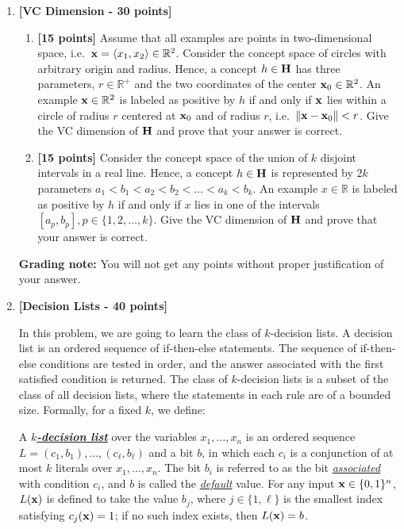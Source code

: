 \begin{enumerate}
\item \textbf{[VC Dimension - 30 points]}
\begin{enumerate}
  \item \textbf{[15 points]}  Assume that all examples are points in two-dimensional space,
  i.e.~${\bf x} = \langle x_1, x_2\rangle \in \mathbb{R}^2$.
Consider the concept space of circles with
  arbitrary origin and radius. Hence, a concept $h \in {\bf H}$ has three
  parameters, $r \in \mathbb{R}^+$ and the two coordinates of the center ${\bf x}_0 \in \mathbb{R}^2$.
  An example ${\bf x} \in \mathbb{R}^2$ is labeled as positive by $h$
  if and only if ${\bf x}$ lies within a circle of radius $r$ centered at ${\bf x}_0$ and of
  radius $r$, i.e.~$\|{\bf x} - {\bf x}_0\| < r$. Give the VC dimension of ${\bf H}$ and prove that your answer is correct.

  \item \textbf{[15 points]} Consider the concept space of the union of $k$ disjoint intervals in a real line.
  Hence, a concept $h \in {\bf H}$ is represented by $2k$ parameters $a_1 < b_1 < a_2 < b_2 < \ldots < a_k < b_k$.
  An example $x \in \mathbb{R}$ is labeled as positive by $h$
  if and only if $x$ lies in one of the intervals $[a_p,b_p], p\in \{1,2,\ldots,k\}$. Give the VC dimension of ${\bf H}$ and  prove that your answer is correct.

  \end{enumerate}

{\bf Grading note:} You will not get any points without proper justification of your answer.

\item \textbf{[Decision Lists - 40 points]}

  In this problem, we are going to learn the class of $k$-decision
  lists.  A decision list is an ordered sequence of if-then-else
  statements. The sequence of if-then-else conditions are tested in
  order, and the answer associated with the first satisfied condition is
  returned. The class of $k$-decision lists is a subset of the class of all 
  decision lists, where the statements in each rule are of a bounded size.
  Formally, for a fixed $k$, we define:

\begin{definition}
  A \textbf{\underline{\em $k$-decision list}} over the variables $x_1, \ldots, x_n$
  is an ordered sequence $L=(c_1, b_1), \ldots, (c_\ell, b_\ell)$ and
  a bit $b$, in which each $c_i$ is a conjunction of at most $k$
  literals over $x_1,\ldots, x_n$.  The bit $b_i$ is referred to as the bit
  \underline{\em associated} with condition $c_{i}$, and $b$ is called the \underline{\em default} value.  For any input ${\bf x} \in \{0,
  1\}^{n}$, $L({\bf x})$ is defined to take the value $b_{j}$, where $j \in \{1, \ell\}$ is the
  smallest index satisfying $c_j({\bf x})=1$; if no such index exists,
  then $L({\bf x})=b$.


\end{definition}
\end{enumerate}
